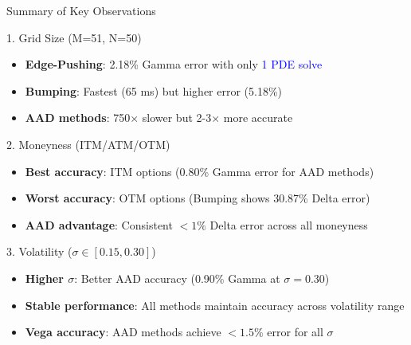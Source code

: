 \documentclass[aspectratio=169]{beamer}
\begin{document}
\begin{frame}{Summary of Key Observations}

\begin{block}{1. Grid Size (M=51, N=50)}
\begin{itemize}
    \item \textbf{Edge-Pushing}: 2.18\% Gamma error with only \textcolor{blue}{1 PDE solve}
    \item \textbf{Bumping}: Fastest (65 ms) but higher error (5.18\%)
    \item \textbf{AAD methods}: 750$\times$ slower but 2-3$\times$ more accurate
\end{itemize}
\end{block}

\begin{block}{2. Moneyness (ITM/ATM/OTM)}
\begin{itemize}
    \item \textbf{Best accuracy}: ITM options (0.80\% Gamma error for AAD methods)
    \item \textbf{Worst accuracy}: OTM options (Bumping shows 30.87\% Delta error)
    \item \textbf{AAD advantage}: Consistent $<1\%$ Delta error across all moneyness
\end{itemize}
\end{block}

\begin{block}{3. Volatility ($\sigma \in [0.15, 0.30]$)}
\begin{itemize}
    \item \textbf{Higher $\sigma$}: Better AAD accuracy (0.90\% Gamma at $\sigma=0.30$)
    \item \textbf{Stable performance}: All methods maintain accuracy across volatility range
    \item \textbf{Vega accuracy}: AAD methods achieve $<1.5\%$ error for all $\sigma$
\end{itemize}
\end{block}

\end{frame}
\end{document}
